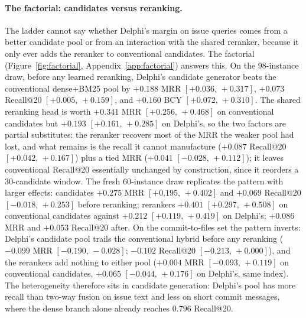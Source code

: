 \documentclass{article}
\newcommand{\ci}[2]{{\footnotesize$[#1,\,#2]$}}
\newcommand{\system}{Delphi}
\begin{document}
\paragraph{The factorial: candidates versus reranking.} The ladder cannot say whether \system{}'s margin on issue queries comes from a better candidate pool or from an interaction with the shared reranker, because it only ever adds the reranker to conventional candidates. The factorial (Figure~\ref{fig:factorial}, Appendix~\ref{app:factorial}) answers this. On the 98-instance draw, before any learned reranking, \system{}'s candidate generator beats the conventional dense+BM25 pool by $+0.188$ MRR \ci{+0.036}{+0.317}, $+0.073$ Recall@20 \ci{+0.005}{+0.159}, and $+0.160$ BCY \ci{+0.072}{+0.310}. The shared reranking head is worth $+0.341$ MRR \ci{+0.256}{+0.468} on conventional candidates but $+0.193$ \ci{+0.161}{+0.285} on \system{}'s, so the two factors are partial substitutes: the reranker recovers most of the MRR the weaker pool had lost, and what remains is the recall it cannot manufacture ($+0.087$ Recall@20 \ci{+0.042}{+0.167}) plus a tied MRR ($+0.041$ \ci{-0.028}{+0.112}); it leaves conventional Recall@20 essentially unchanged by construction, since it reorders a 30-candidate window. The fresh 60-instance draw replicates the pattern with larger effects: candidates $+0.275$ MRR \ci{+0.195}{+0.402} and $+0.069$ Recall@20 \ci{-0.018}{+0.253} before reranking; rerankers $+0.401$ \ci{+0.297}{+0.508} on conventional candidates against $+0.212$ \ci{+0.119}{+0.419} on \system{}'s; $+0.086$ MRR and $+0.053$ Recall@20 after. On the commit-to-files set the pattern inverts: \system{}'s candidate pool trails the conventional hybrid before any reranking ($-0.099$ MRR \ci{-0.190}{-0.028}; $-0.102$ Recall@20 \ci{-0.213}{+0.000}), and the rerankers add nothing to either pool ($+0.004$ MRR \ci{-0.093}{+0.119} on conventional candidates, $+0.065$ \ci{-0.044}{+0.176} on \system{}'s, same index). The heterogeneity therefore sits in candidate generation: \system{}'s pool has more recall than two-way fusion on issue text and less on short commit messages, where the dense branch alone already reaches $0.796$ Recall@20.

\begin{table}[t]
\centering
\caption{Branch-level ablation of \system{}'s candidate generator on the fresh 60-instance SWE-bench draw (C0), rerankers off, expansion on. Each row removes one fusion branch (weight set to zero) or keeps only vector and BM25; $\Delta$ is ablation minus the full six-branch generator with repository-cluster bootstrap $95\%$ intervals; $^{*}$ excludes zero (Recall@5 in Appendix~\ref{app:branches}).}
\label{tab:branches}
\footnotesize
\setlength{\tabcolsep}{3pt}
\resizebox{\textwidth}{!}{}
\end{table}
\end{document}
